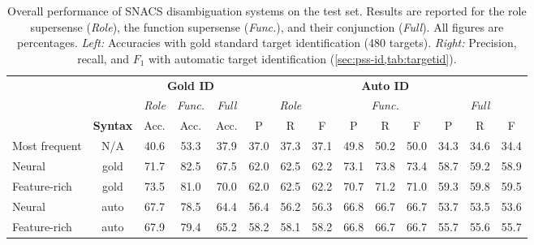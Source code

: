 \pdfoutput=1 \documentclass[11pt,a4paper]{article}
\begin{document}
\begin{table*}[]
	\centering\small
	\begin{tabular}{@{}lcccc<{\hspace{5pt}}ccc|ccc|ccc@{}}
&        & \multicolumn{3}{c}{\textbf{Gold ID}} & \multicolumn{9}{c}{\textbf{Auto ID}}                                                                                                                     \\
        \cmidrule(r){3-5}\cmidrule(l){6-14}
                          &         & \textit{Role}                        & \textit{Func.} & \textit{Full} & \multicolumn{3}{c}{\textit{Role}} & \multicolumn{3}{c}{\textit{Func.}} & \multicolumn{3}{c}{\textit{Full}}              \\
                          & \textbf{Syntax}       & Acc.                                 & Acc.           & Acc.          & P                                 & R                                  & F    & P    & R    & F    & P    & R    & F    \\
		\midrule
        Most frequent & N/A  & 40.6 & 53.3 & 37.9 & 37.0 & 37.3 & 37.1 & 49.8 & 50.2 & 50.0 & 34.3 & 34.6 & 34.4 \\
        Neural        & gold & 71.7 & 82.5 & 67.5 & 62.0 & 62.5 & 62.2 & 73.1 & 73.8 & 73.4 & 58.7 & 59.2 & 58.9 \\
        Feature-rich  & gold & 73.5 & 81.0 & 70.0 & 62.0 & 62.5 & 62.2 & 70.7 & 71.2 & 71.0 & 59.3 & 59.8 & 59.5 \\
        \midrule
        Neural        & auto & 67.7 & 78.5 & 64.4 & 56.4 & 56.2 & 56.3 & 66.8 & 66.7 & 66.7 & 53.7 & 53.5 & 53.6 \\
        Feature-rich  & auto & 67.9 & 79.4 & 65.2 & 58.2 & 58.1 & 58.2 & 66.8 & 66.7 & 66.7 & 55.7 & 55.6 & 55.7 \\

\end{tabular}
	\caption{\label{tab:overall} Overall performance of SNACS disambiguation systems on the test set. Results are reported for the role supersense ({\it Role}), the function supersense ({\it Func.}), and their conjunction ({\it Full}). All figures are percentages. 
    \textit{Left:} Accuracies with gold standard target identification (480 targets).
    \textit{Right:} Precision, recall, and $F_1$ with automatic target identification (\cref{sec:pss-id,tab:targetid}).} \end{table*}
\end{document}
